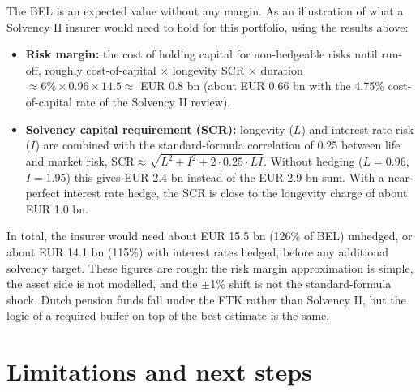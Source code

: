 \documentclass[11pt,a4paper]{article}
\begin{document}
The BEL is an expected value without any margin. As an illustration of what a Solvency II
insurer would need to hold for this portfolio, using the results above:
\begin{itemize}
  \item \textbf{Risk margin:} the cost of holding capital for non-hedgeable risks until run-off,
        roughly cost-of-capital $\times$ longevity SCR $\times$ duration
        $\approx 6\% \times 0.96 \times 14.5 \approx$ EUR 0.8 bn (about EUR 0.66 bn with the
        4.75\% cost-of-capital rate of the Solvency II review).
  \item \textbf{Solvency capital requirement (SCR):} longevity ($L$) and interest rate risk
        ($I$) are combined with the standard-formula correlation of 0.25 between life and
        market risk, $\text{SCR} \approx \sqrt{L^2 + I^2 + 2 \cdot 0.25 \cdot L I}$.
        Without hedging ($L = 0.96$, $I = 1.95$) this gives EUR 2.4 bn instead of the EUR 2.9 bn
        sum. With a near-perfect interest rate hedge, the SCR is close to the longevity charge of
        about EUR 1.0 bn.
\end{itemize}
In total, the insurer would need about EUR 15.5 bn (126\% of BEL) unhedged, or about
EUR 14.1 bn (115\%) with interest rates hedged, before any additional solvency target. These
figures are rough: the risk margin approximation is simple, the asset side is not modelled, and
the $\pm$1\% shift is not the standard-formula shock. Dutch pension funds fall under the FTK
rather than Solvency II, but the logic of a required buffer on top of the best estimate is the same.

\section{Limitations and next steps}
\end{document}
